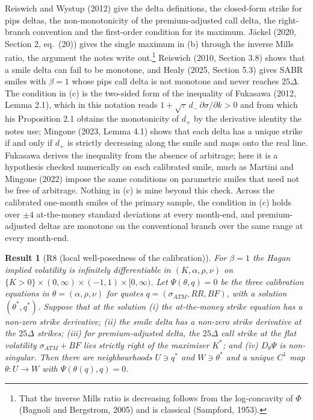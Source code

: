 \documentclass[11pt]{article}
\theoremstyle{result}
\newtheorem*{result}{Result}
\newcommand{\D}{\Delta}
\begin{document}
Reiswich and Wystup (2012) give the delta definitions, the closed-form strike for pips deltas, the non-monotonicity of the premium-adjusted call delta, the right-branch convention and the first-order condition for its maximum. J\"ackel (2020, Section 2, eq.~(20)) gives the single maximum in (b) through the inverse Mills ratio, the argument the notes write out.\footnote{That the inverse Mills ratio is decreasing follows from the log-concavity of $\Phi$ (Bagnoli and Bergstrom, 2005) and is classical (Sampford, 1953).} Reiswich (2010, Section 3.8) shows that a smile delta can fail to be monotone, and Healy (2025, Section 5.3) gives SABR smiles with $\beta=1$ whose pips call delta is not monotone and never reaches $25\D$. The condition in (c) is the two-sided form of the inequality of Fukasawa (2012, Lemma 2.1), which in this notation reads $1+\sqrt\tau\,d_-\,\partial\sigma/\partial k>0$ and from which his Proposition 2.1 obtains the monotonicity of $d_+$ by the derivative identity the notes use; Mingone (2023, Lemma 4.1) shows that each delta has a unique strike if and only if $d_+$ is strictly decreasing along the smile and maps onto the real line. Fukasawa derives the inequality from the absence of arbitrage; here it is a hypothesis checked numerically on each calibrated smile, much as Martini and Mingone (2022) impose the same conditions on parametric smiles that need not be free of arbitrage. Nothing in (c) is mine beyond this check. Across the calibrated one-month smiles of the primary sample, the condition in (c) holds over $\pm4$ at-the-money standard deviations at every month-end, and premium-adjusted deltas are monotone on the conventional branch over the same range at every month-end.

\begin{result}[R8 (local well-posedness of the calibration)]
For $\beta=1$ the Hagan implied volatility is infinitely differentiable in $(K,\alpha,\rho,\nu)$ on $\{K>0\}\times(0,\infty)\times(-1,1)\times[0,\infty)$. Let $\Psi(\theta,q)=0$ be the three calibration equations in $\theta=(\alpha,\rho,\nu)$ for quotes $q=(\sigma_{ATM},RR,BF)$, with a solution $(\theta^*,q^*)$. Suppose that at the solution (i) the at-the-money strike equation has a non-zero strike derivative; (ii) the smile delta has a non-zero strike derivative at the $25\D$ strikes; (iii) for premium-adjusted delta, the $25\D$ call strike at the flat volatility $\sigma_{ATM}+BF$ lies strictly right of the maximiser $K^*$; and (iv) $D_\theta\Psi$ is non-singular. Then there are neighbourhoods $U\ni q^*$ and $W\ni\theta^*$ and a unique $C^1$ map $\theta:U\to W$ with $\Psi(\theta(q),q)=0$.
\end{result}
\end{document}
